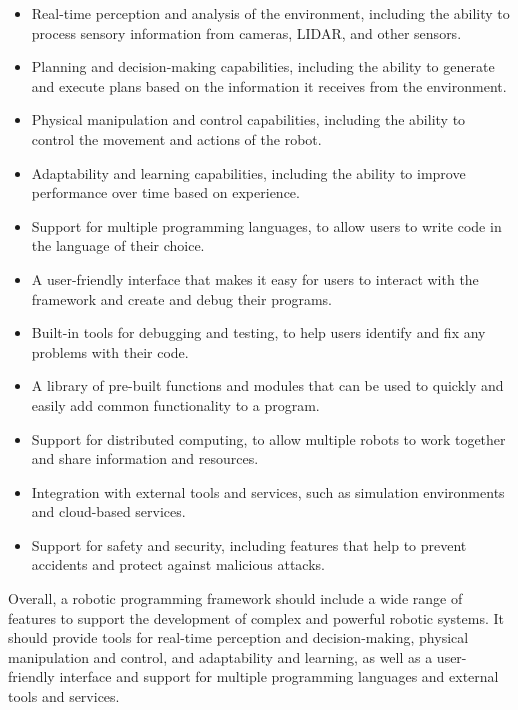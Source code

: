 \documentclass[%
oneside,    %
project,    %
nosummary   %
]{USN-MSc}
\begin{document}
\begin{itemize}
  \item Real-time perception and analysis of the environment, including the ability to process sensory information from cameras, LIDAR, and other sensors.
  \item Planning and decision-making capabilities, including the ability to generate and execute plans based on the information it receives from the environment.
  \item Physical manipulation and control capabilities, including the ability to control the movement and actions of the robot.
  \item Adaptability and learning capabilities, including the ability to improve performance over time based on experience.
  \item Support for multiple programming languages, to allow users to write code in the language of their choice.
  \item A user-friendly interface that makes it easy for users to interact with the framework and create and debug their programs.
  \item Built-in tools for debugging and testing, to help users identify and fix any problems with their code.
  \item A library of pre-built functions and modules that can be used to quickly and easily add common functionality to a program.
  \item Support for distributed computing, to allow multiple robots to work together and share information and resources.
  \item Integration with external tools and services, such as simulation environments and cloud-based services.
  \item Support for safety and security, including features that help to prevent accidents and protect against malicious attacks.
\end{itemize}

Overall, a robotic programming framework should include a wide range of features to support the development of complex and powerful robotic systems. It should provide tools for real-time perception and decision-making, physical manipulation and control, and adaptability and learning, as well as a user-friendly interface and support for multiple programming languages and external tools and services.
\end{document}
